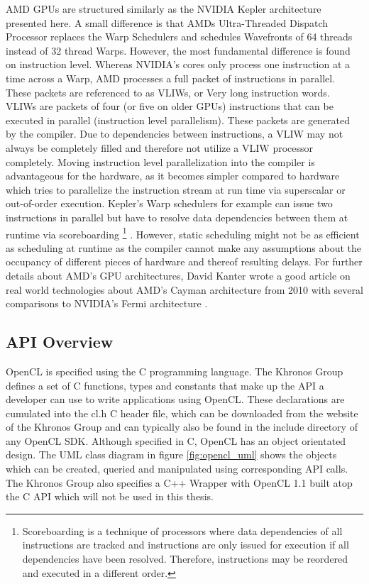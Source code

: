 AMD GPUs are structured similarly as the NVIDIA Kepler architecture presented here. A small difference is that AMDs Ultra-Threaded Dispatch Processor replaces the Warp Schedulers and schedules Wavefronts of 64 threads instead of 32 thread Warps. However, the most fundamental difference is found on instruction level. Whereas NVIDIA's cores only process one instruction at a time across a Warp, AMD processes a full packet of instructions in parallel. These packets are referenced to as VLIWs, or Very long instruction words. VLIWs are packets of four (or five on older GPUs) instructions that can be executed in parallel (instruction level parallelism). These packets are generated by the compiler. Due to dependencies between instructions, a VLIW may not always be completely filled and therefore not utilize a VLIW processor completely. Moving instruction level parallelization into the compiler is advantageous for the hardware, as it becomes simpler compared to hardware which tries to parallelize the instruction stream at run time via superscalar or out-of-order execution. Kepler's Warp schedulers for example can issue two instructions in parallel but have to resolve data dependencies between them at runtime via scoreboarding \footnote{Scoreboarding is a technique of processors where data dependencies of all instructions are tracked and instructions are only issued for execution if all dependencies have been resolved. Therefore, instructions may be reordered and executed in a different order.} \cite[p.4]{cayman_arch}. However, static scheduling might not be as efficient as scheduling at runtime as the compiler cannot make any assumptions about the occupancy of different pieces of hardware and thereof resulting delays. For further details about AMD's GPU architectures, David Kanter wrote a good article on real world technologies about AMD's Cayman architecture from 2010 with several comparisons to NVIDIA's Fermi architecture \cite{cayman_arch}.

\subsection{API Overview}

OpenCL is specified using the C programming language. The Khronos Group defines a set of C functions, types and constants that make up the API a developer can use to write applications using OpenCL. These declarations are cumulated into the cl.h C header file, which can be downloaded from the website of the Khronos Group and can typically also be found in the include directory of any OpenCL SDK. Although specified in C, OpenCL has an object orientated design. The UML class diagram in figure \ref{fig:opencl_uml} shows the objects which can be created, queried and manipulated using corresponding API calls. The Khronos Group also specifies a C++ Wrapper with OpenCL 1.1 built atop the C API which will not be used in this thesis.

